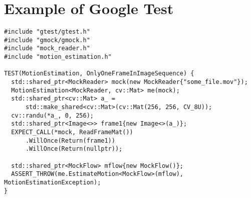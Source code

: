 \chapter{\label{ap:google_test}Example of Google Test}

\begin{verbatim}
#include "gtest/gtest.h"
#include "gmock/gmock.h"
#include "mock_reader.h"
#include "motion_estimation.h"

TEST(MotionEstimation, OnlyOneFrameInImageSequence) {
  std::shared_ptr<MockReader> mock(new MockReader{"some_file.mov"});
  MotionEstimation<MockReader, cv::Mat> me(mock);
  std::shared_ptr<cv::Mat> a_ =
      std::make_shared<cv::Mat>(cv::Mat(256, 256, CV_8U));
  cv::randu(*a_, 0, 256);
  std::shared_ptr<Image<>> frame1{new Image<>(a_)};
  EXPECT_CALL(*mock, ReadFrameMat())
      .WillOnce(Return(frame1))
      .WillOnce(Return(nullptr));

  std::shared_ptr<MockFlow> mflow{new MockFlow()};
  ASSERT_THROW(me.EstimateMotion<MockFlow>(mflow), MotionEstimationException);
}
\end{verbatim}
